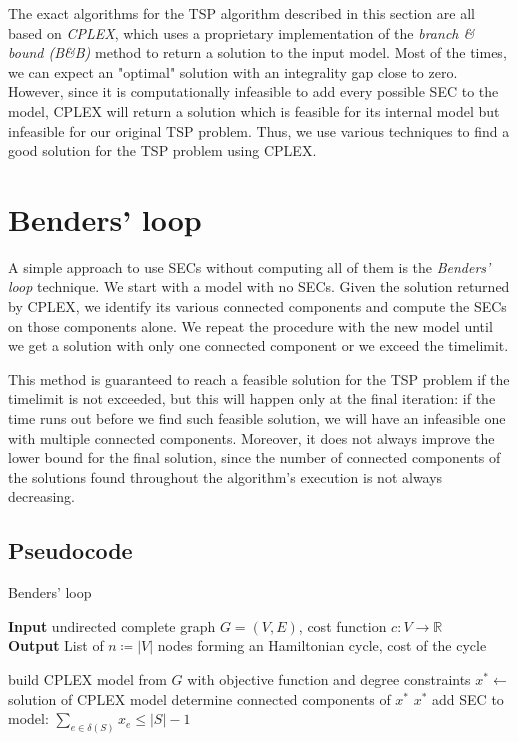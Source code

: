 The exact algorithms for the TSP algorithm described in this section are all based on \textit{CPLEX}, which uses a proprietary implementation of the \textit{branch \& bound (B\&B)} method to return a solution to the input model. Most of the times, we can expect an "optimal" solution with an integrality gap close to zero. However, since it is computationally infeasible to add every possible SEC to the model, CPLEX will return a solution which is feasible for its internal model but infeasible for our original TSP problem. Thus, we use various techniques to find a good solution for the TSP problem using CPLEX.

\section{Benders' loop}
A simple approach to use SECs without computing all of them is the \textit{Benders' loop} technique. We start with a model with no SECs. Given the solution returned by CPLEX, we identify its various connected components and compute the SECs on those components alone. We repeat the procedure with the new model until we get a solution with only one connected component or we exceed the timelimit.

This method is guaranteed to reach a feasible solution for the TSP problem if the timelimit is not exceeded, but this will happen only at the final iteration: if the time runs out before we find such feasible solution, we will have an infeasible one with multiple connected components. Moreover, it does not always improve the lower bound for the final solution, since the number of connected components of the solutions found throughout the algorithm's execution is not always decreasing.

\FloatBarrier
\subsection{Pseudocode}
\begin{algorithm}[h]
    \caption{Benders' loop}
    \hspace*{\algorithmicindent} \textbf{Input} undirected complete graph $G=(V,E)$, cost function $c:V\rightarrow\mathbb{R}$\\
    \hspace*{\algorithmicindent} \textbf{Output} List of $n\coloneq|V|$ nodes forming an Hamiltonian cycle, cost of the cycle
    \begin{algorithmic}

        \State build CPLEX model from $G$ with objective function and degree constraints
        \State $x^* \leftarrow$ solution of CPLEX model
        \State determine connected components of $x^*$
        \Return $x^*$
        \EndIf
        \State add SEC to model: $\sum_{e\in\delta(S)}x_e\leq|S|-1$
        \EndFor
        \EndWhile

    \end{algorithmic}
\end{algorithm}
\FloatBarrier

